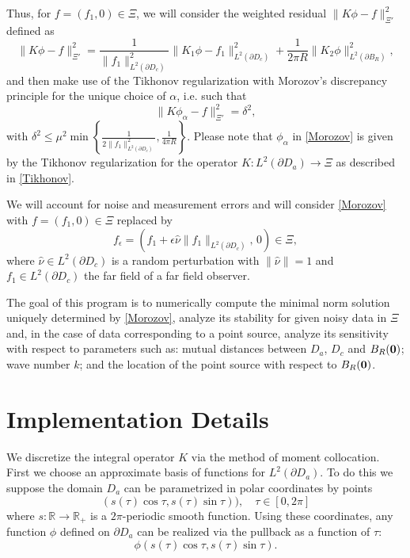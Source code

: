 \documentclass[11pt]{amsart}
\theoremstyle{definition}
\theoremstyle{definition}
\theoremstyle{definition}
\def\B0{{\bf 0}}
\begin{document}
Thus, for $f=(f_1,0)\in \Xi$, we will consider the weighted residual $\|K\phi - f\|_{\Xi'}^{2}$ defined as  
\begin{equation}
\label{disc-fun}
\|K\phi - f\|_{\Xi'}^{2} = \displaystyle\frac{1}{\|f_{1}\|_{L^{2}(\partial D_{c})}^{2}}\| K_1\phi  - f_{1}\|_{L^{2}(\partial D_{c})}^{2} + \frac{1}{2\pi R} \|K_2\phi \|_{L^{2}(\partial B_{R})}^{2},
\end{equation}
and then make use of the Tikhonov regularization with Morozov's discrepancy principle for the unique choice of $\alpha$, i.e. such that
\begin{equation}
\label{Morozov}
\|K\phi_\alpha - f\|_{\Xi'}^{2} =\delta^2,
\end{equation}
with $\displaystyle\delta^2\leq \mu^2\min\left\{\frac{1}{2\|f_{1}\|^2_{L^{2}(\partial D_{c})}}, \frac{1}{4\pi R}\right\}$.
Please note that $\phi_\alpha$ in \eqref{Morozov} is given by the Tikhonov regularization for the operator  $K:L^2(\partial D_a)\rightarrow \Xi$ as described in \eqref{Tikhonov}. 

We will account for noise and measurement errors and will consider \eqref{Morozov} with $f=(f_1,0)\in \Xi$ replaced by 
\begin{equation}
\label{random-f}
f_{\epsilon} = (f_{1} + \epsilon \widehat{\nu}\|f_{1}\|_{L^{2}(\partial D_{c})}, \, 0)\in \Xi,
\end{equation} 
where $\widehat{\nu} \in L^{2}(\partial D_{c})$ is a random perturbation with $\|\widehat{\nu}\| = 1$ and $f_{1} \in L^{2}(\partial D_{c})$ the far field of a far field observer. 

The goal of this program is to numerically compute the minimal norm solution uniquely determined by \eqref{Morozov}, analyze its stability for given noisy data in $\Xi$ and, in the case of data corresponding to a point source, analyze its sensitivity with respect to parameters such as: mutual distances between $D_a$, $D_c$ and $B_R(\B0)$; wave number $k$; and the location of the point source with respect to $B_R(\B0)$.

\section{Implementation Details}
We discretize the integral operator $K$ via the method of moment collocation. First we choose an approximate basis of functions for $L^{2}(\partial D_{a})$. To do this we suppose the domain $D_{a}$ can be parametrized in polar coordinates by points
\begin{equation*}
(s(\tau)\cos{\tau}, s(\tau)\sin{\tau})), \quad \tau \in [0,2\pi]
\end{equation*}
where $s:\mathbb{R} \to \mathbb{R}_{+}$ is a $2\pi$-periodic smooth function. Using these coordinates, any function $\phi$ defined on $\partial D_{a}$ can be realized via the pullback as a function of $\tau$:
\begin{equation*}
\phi(s(\tau)\cos{\tau}, s(\tau)\sin{\tau}).
\end{equation*}
\end{document}

